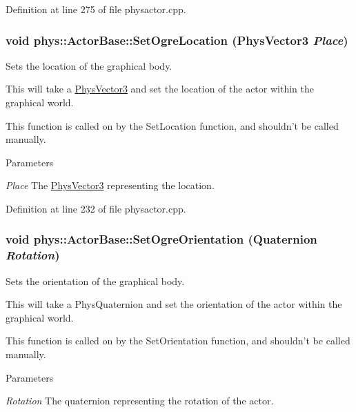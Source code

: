 Definition at line 275 of file physactor.cpp.

\hypertarget{classphys_1_1ActorBase_af8a6cb524bda889b7a38f0245a7381fb}{
\subsubsection[{SetOgreLocation}]{\setlength{\rightskip}{0pt plus 5cm}void phys::ActorBase::SetOgreLocation ({\bf PhysVector3} {\em Place})}}
\label{d8/d0f/classphys_1_1ActorBase_af8a6cb524bda889b7a38f0245a7381fb}


Sets the location of the graphical body. 

This will take a \hyperlink{classPhysVector3}{PhysVector3} and set the location of the actor within the graphical world. \par
 This function is called on by the SetLocation function, and shouldn't be called manually. 
\begin{DoxyParams}{Parameters}
\item[{\em Place}]The \hyperlink{classPhysVector3}{PhysVector3} representing the location. \end{DoxyParams}


Definition at line 232 of file physactor.cpp.

\hypertarget{classphys_1_1ActorBase_a7b2d13cb1e8bba60eeae782a53fd5e49}{
\subsubsection[{SetOgreOrientation}]{\setlength{\rightskip}{0pt plus 5cm}void phys::ActorBase::SetOgreOrientation ({\bf Quaternion} {\em Rotation})}}
\label{d8/d0f/classphys_1_1ActorBase_a7b2d13cb1e8bba60eeae782a53fd5e49}


Sets the orientation of the graphical body. 

This will take a PhysQuaternion and set the orientation of the actor within the graphical world. \par
 This function is called on by the SetOrientation function, and shouldn't be called manually. 
\begin{DoxyParams}{Parameters}
\item[{\em Rotation}]The quaternion representing the rotation of the actor. \end{DoxyParams}



